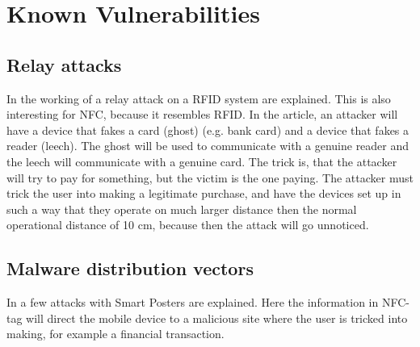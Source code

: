 \chapter{Known Vulnerabilities}
\label{chap:known_vulnerabilities}

\section{Relay attacks}
In \cite{1128470} the working of a relay attack on  a RFID system are explained.
This is also interesting for NFC, because it resembles RFID.
In the article, an attacker will have a device that fakes a card (ghost) (e.g. bank card) and a device that fakes a reader (leech). 
The ghost will be used to communicate with a genuine reader and the leech will communicate with a genuine card.
The trick is, that the attacker will try to pay for something, but the victim is the one paying.
The attacker must trick the user into making a legitimate purchase, and have the devices set up in such a way that they operate on much larger distance then the normal operational distance of 10 cm, because then the attack will go unnoticed.



\section{Malware distribution vectors}
In \cite{10.1109/ARES.2009.46} a few attacks with Smart Posters are explained.
Here the information in NFC-tag will direct the mobile device to a malicious site where the user is tricked into making, for example a financial transaction.


